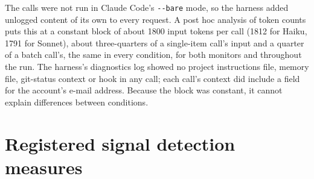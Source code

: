 \documentclass[10pt]{article}
\newcommand{\code}[1]{\texttt{#1}}
\begin{document}
The calls were not run in Claude Code's \code{-{}-bare} mode, so the harness added unlogged content of its own to every request. A post hoc analysis of token counts puts this at a constant block of about \num{1800} input tokens per call (\num{1812} for Haiku, \num{1791} for Sonnet), about three-quarters of a single-item call's input and a quarter of a batch call's, the same in every condition, for both monitors and throughout the run. The harness's diagnostics log showed no project instructions file, memory file, git-status context or hook in any call; each call's context did include a field for the account's e-mail address. Because the block was constant, it cannot explain differences between conditions.

\section{Registered signal detection measures}\label{app:sdt}
\end{document}
